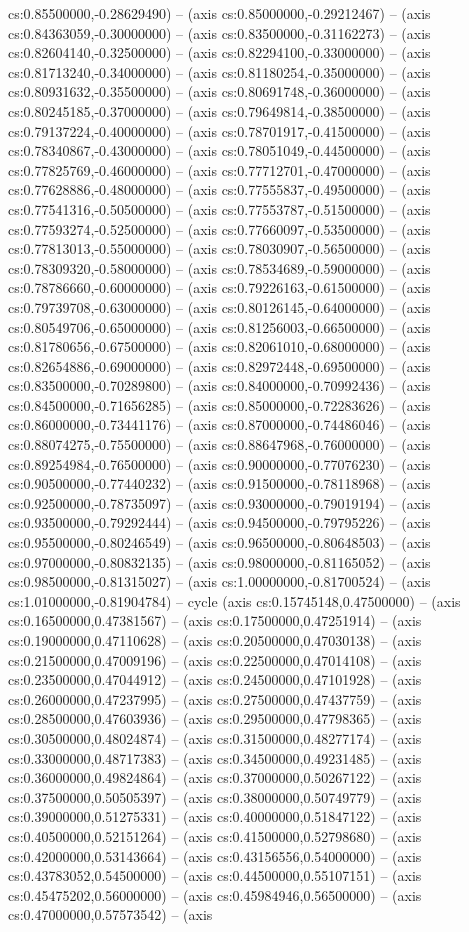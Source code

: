 cs:0.85500000,-0.28629490) -- (axis cs:0.85000000,-0.29212467) -- (axis cs:0.84363059,-0.30000000) -- (axis cs:0.83500000,-0.31162273) -- (axis cs:0.82604140,-0.32500000) -- (axis cs:0.82294100,-0.33000000) -- (axis cs:0.81713240,-0.34000000) -- (axis cs:0.81180254,-0.35000000) -- (axis cs:0.80931632,-0.35500000) -- (axis cs:0.80691748,-0.36000000) -- (axis cs:0.80245185,-0.37000000) -- (axis cs:0.79649814,-0.38500000) -- (axis cs:0.79137224,-0.40000000) -- (axis cs:0.78701917,-0.41500000) -- (axis cs:0.78340867,-0.43000000) -- (axis cs:0.78051049,-0.44500000) -- (axis cs:0.77825769,-0.46000000) -- (axis cs:0.77712701,-0.47000000) -- (axis cs:0.77628886,-0.48000000) -- (axis cs:0.77555837,-0.49500000) -- (axis cs:0.77541316,-0.50500000) -- (axis cs:0.77553787,-0.51500000) -- (axis cs:0.77593274,-0.52500000) -- (axis cs:0.77660097,-0.53500000) -- (axis cs:0.77813013,-0.55000000) -- (axis cs:0.78030907,-0.56500000) -- (axis cs:0.78309320,-0.58000000) -- (axis cs:0.78534689,-0.59000000) -- (axis cs:0.78786660,-0.60000000) -- (axis cs:0.79226163,-0.61500000) -- (axis cs:0.79739708,-0.63000000) -- (axis cs:0.80126145,-0.64000000) -- (axis cs:0.80549706,-0.65000000) -- (axis cs:0.81256003,-0.66500000) -- (axis cs:0.81780656,-0.67500000) -- (axis cs:0.82061010,-0.68000000) -- (axis cs:0.82654886,-0.69000000) -- (axis cs:0.82972448,-0.69500000) -- (axis cs:0.83500000,-0.70289800) -- (axis cs:0.84000000,-0.70992436) -- (axis cs:0.84500000,-0.71656285) -- (axis cs:0.85000000,-0.72283626) -- (axis cs:0.86000000,-0.73441176) -- (axis cs:0.87000000,-0.74486046) -- (axis cs:0.88074275,-0.75500000) -- (axis cs:0.88647968,-0.76000000) -- (axis cs:0.89254984,-0.76500000) -- (axis cs:0.90000000,-0.77076230) -- (axis cs:0.90500000,-0.77440232) -- (axis cs:0.91500000,-0.78118968) -- (axis cs:0.92500000,-0.78735097) -- (axis cs:0.93000000,-0.79019194) -- (axis cs:0.93500000,-0.79292444) -- (axis cs:0.94500000,-0.79795226) -- (axis cs:0.95500000,-0.80246549) -- (axis cs:0.96500000,-0.80648503) -- (axis cs:0.97000000,-0.80832135) -- (axis cs:0.98000000,-0.81165052) -- (axis cs:0.98500000,-0.81315027) -- (axis cs:1.00000000,-0.81700524) -- (axis cs:1.01000000,-0.81904784) -- cycle (axis cs:0.15745148,0.47500000) -- (axis cs:0.16500000,0.47381567) -- (axis cs:0.17500000,0.47251914) -- (axis cs:0.19000000,0.47110628) -- (axis cs:0.20500000,0.47030138) -- (axis cs:0.21500000,0.47009196) -- (axis cs:0.22500000,0.47014108) -- (axis cs:0.23500000,0.47044912) -- (axis cs:0.24500000,0.47101928) -- (axis cs:0.26000000,0.47237995) -- (axis cs:0.27500000,0.47437759) -- (axis cs:0.28500000,0.47603936) -- (axis cs:0.29500000,0.47798365) -- (axis cs:0.30500000,0.48024874) -- (axis cs:0.31500000,0.48277174) -- (axis cs:0.33000000,0.48717383) -- (axis cs:0.34500000,0.49231485) -- (axis cs:0.36000000,0.49824864) -- (axis cs:0.37000000,0.50267122) -- (axis cs:0.37500000,0.50505397) -- (axis cs:0.38000000,0.50749779) -- (axis cs:0.39000000,0.51275331) -- (axis cs:0.40000000,0.51847122) -- (axis cs:0.40500000,0.52151264) -- (axis cs:0.41500000,0.52798680) -- (axis cs:0.42000000,0.53143664) -- (axis cs:0.43156556,0.54000000) -- (axis cs:0.43783052,0.54500000) -- (axis cs:0.44500000,0.55107151) -- (axis cs:0.45475202,0.56000000) -- (axis cs:0.45984946,0.56500000) -- (axis cs:0.47000000,0.57573542) -- (axis 